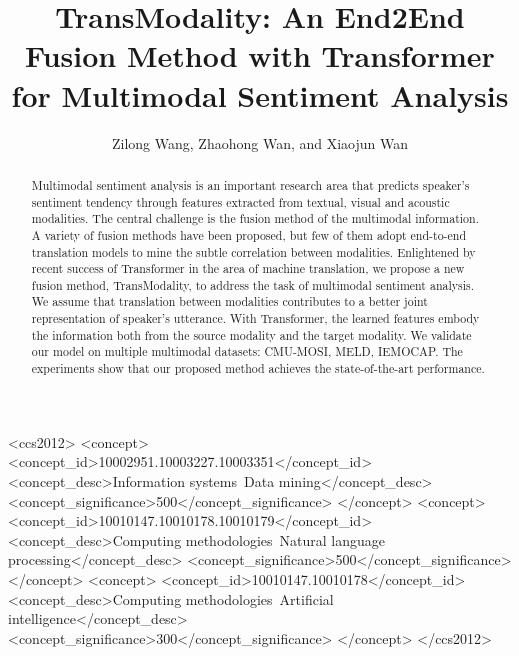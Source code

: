\documentclass[sigconf]{acmart}
\begin{document}
\title[TransModality: An End2End Fusion Method with Transformer]{TransModality: An End2End Fusion Method with Transformer for Multimodal Sentiment Analysis}



\author{Zilong Wang, Zhaohong Wan, and Xiaojun Wan}







\renewcommand{\shortauthors}{Zilong Wang, Zhaohong Wan, Xiaojun Wan}

\begin{abstract}
  Multimodal sentiment analysis is an important research area that predicts speaker's sentiment tendency through features extracted from textual, visual and acoustic modalities. The central challenge is the fusion method of the multimodal information. A variety of fusion methods have been proposed, but few of them adopt end-to-end translation models to mine the subtle correlation between modalities. Enlightened by recent success of Transformer in the area of machine translation, we propose a new fusion method, TransModality, to address the task of multimodal sentiment analysis. We assume that translation between modalities contributes to a better joint representation of speaker's utterance. With Transformer, the learned features embody the information both from the source modality and the target modality. We validate our model on multiple multimodal datasets: CMU-MOSI, MELD, IEMOCAP. The experiments show that our proposed method achieves the state-of-the-art performance.
\end{abstract}

\begin{CCSXML}
	<ccs2012>
	<concept>
	<concept_id>10002951.10003227.10003351</concept_id>
	<concept_desc>Information systems~Data mining</concept_desc>
	<concept_significance>500</concept_significance>
	</concept>
	<concept>
	<concept_id>10010147.10010178.10010179</concept_id>
	<concept_desc>Computing methodologies~Natural language processing</concept_desc>
	<concept_significance>500</concept_significance>
	</concept>
	<concept>
	<concept_id>10010147.10010178</concept_id>
	<concept_desc>Computing methodologies~Artificial intelligence</concept_desc>
	<concept_significance>300</concept_significance>
	</concept>
	</ccs2012>
	\end{CCSXML}
	
\end{document}
